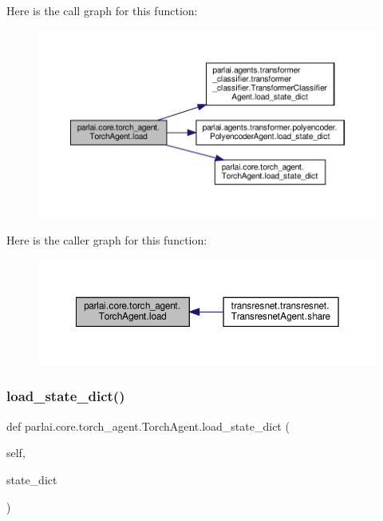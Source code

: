 Here is the call graph for this function\+:
\nopagebreak
\begin{figure}[H]
\begin{center}
\leavevmode
\includegraphics[width=350pt]{classparlai_1_1core_1_1torch__agent_1_1TorchAgent_af626fc7d32fc9b0dfeec167a52353baf_cgraph}
\end{center}
\end{figure}
Here is the caller graph for this function\+:
\nopagebreak
\begin{figure}[H]
\begin{center}
\leavevmode
\includegraphics[width=350pt]{classparlai_1_1core_1_1torch__agent_1_1TorchAgent_af626fc7d32fc9b0dfeec167a52353baf_icgraph}
\end{center}
\end{figure}
\mbox{\label{classparlai_1_1core_1_1torch__agent_1_1TorchAgent_a5dcfca62a677f8de97f09ce993258f84}} 
\subsubsection{\texorpdfstring{load\+\_\+state\+\_\+dict()}{load\_state\_dict()}}
{\footnotesize\ttfamily def parlai.\+core.\+torch\+\_\+agent.\+Torch\+Agent.\+load\+\_\+state\+\_\+dict (\begin{DoxyParamCaption}\item[{}]{self,  }\item[{}]{state\+\_\+dict }\end{DoxyParamCaption})}

